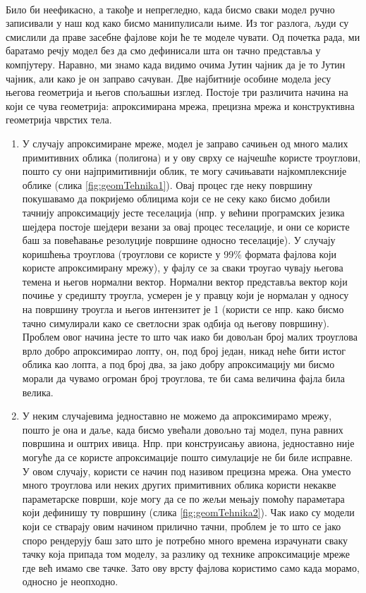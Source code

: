 \documentclass[12pt]{article}
\begin{document}
	\paragraph{}
	Било би неефикасно, а такође и непрегледно, када бисмо сваки модел ручно записивали у наш код како бисмо манипулисали њиме. Из тог разлога, људи су смислили да праве засебне фајлове који ће те моделе чувати. Од почетка рада, ми баратамо речју модел без да смо дефинисали шта он тачно представља у компјутеру. Наравно, ми знамо када видимо очима Јутин чајник да је то Јутин чајник, али како је он заправо сачуван. Две најбитније особине модела јесу његова геометрија и његов спољашњи изглед.
	Постоје три различита начина на који се чува геометрија: апроксимирана мрежа, прецизна мрежа и конструктивна геометрија чврстих тела.
	\begin{enumerate}
	\item У случају апроксимиране мреже, модел је заправо сачињен од много малих примитивних облика (полигона) и у ову сврху се најчешће користе троуглови, пошто су они најпримитивнији облик, те могу сачињавати најкомплексније облике (слика \ref{fig:geomTehnika1}). Овај процес где неку површину покушавамо да покријемо облицима који се не секу како бисмо добили тачнију апроксимацију јесте теселација (нпр. у већини програмских језика шејдера постоје шејдери везани за овај процес теселације, и они се користе баш за повећавање резолуције површине односно теселације). У случају коришћења троуглова (троуглови се користе у 99\% формата фајлова који користе апроксимирану мрежу), у фајлу се за сваки троугао чувају његова темена и његов нормални вектор. Нормални вектор представља вектор који почиње у средишту троугла, усмерен је у правцу који је нормалан у односу на површину троугла и његов интензитет је 1 (користи се нпр. како бисмо тачно симулирали како се светлосни зрак одбија од његову површину). Проблем овог начина јесте то што чак иако би довољан број малих троуглова врло добро апроксимирао лопту, он, под број један, никад неће бити истог облика као лопта, а под број два, за јако добру апроксимацију ми бисмо морали да чувамо огроман број троуглова, те би сама величина фајла била велика.
	\item У неким случајевима једноставно не можемо да апроксимирамо мрежу, пошто је она и даље, када бисмо увећали довољно тај модел, пуна равних површина и оштрих ивица. Нпр. при конструисању авиона, једноставно није могуће да се користе апроксимације пошто симулације не би биле исправне. У овом случају, користи се начин под називом прецизна мрежа. Она уместо много троуглова или неких других примитивних облика користи некакве параметарске површи, које могу да се по жељи мењају помоћу параметара који дефинишу ту површину (слика \ref{fig:geomTehnika2}). Чак иако су модели који се стварају овим начином прилично тачни, проблем је то што се јако споро рендерују баш зато што је потребно много времена израчунати сваку тачку која припада том моделу, за разлику од технике апроксимације мреже где већ имамо све тачке. Зато ову врсту фајлова користимо само када морамо, односно је неопходно.

\end{enumerate}
\end{document}
